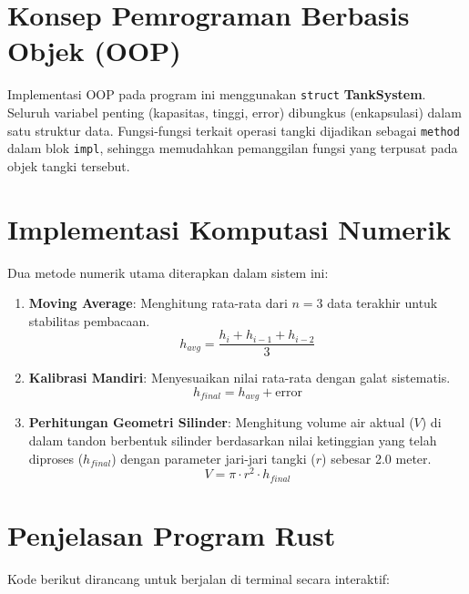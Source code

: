 \documentclass[12pt,a4paper]{article}
\begin{document}
\section{Konsep Pemrograman Berbasis Objek (OOP)}
Implementasi OOP pada program ini menggunakan \texttt{struct} \textbf{TankSystem}. Seluruh variabel penting (kapasitas, tinggi, error) dibungkus (enkapsulasi) dalam satu struktur data. Fungsi-fungsi terkait operasi tangki dijadikan sebagai \texttt{method} dalam blok \texttt{impl}, sehingga memudahkan pemanggilan fungsi yang terpusat pada objek tangki tersebut.

\section{Implementasi Komputasi Numerik}
Dua metode numerik utama diterapkan dalam sistem ini:
\begin{enumerate}
    \item \textbf{Moving Average}: Menghitung rata-rata dari $n=3$ data terakhir untuk stabilitas pembacaan.
    \begin{equation}
        h_{avg} = \frac{h_i + h_{i-1} + h_{i-2}}{3}
    \end{equation}
    \item \textbf{Kalibrasi Mandiri}: Menyesuaikan nilai rata-rata dengan galat sistematis.
    \begin{equation}
        h_{final} = h_{avg} + \text{error}
    \end{equation}
    \item \textbf{Perhitungan Geometri Silinder}: Menghitung volume air aktual ($V$) di dalam tandon berbentuk silinder berdasarkan nilai ketinggian yang telah diproses ($h_{final}$) dengan parameter jari-jari tangki ($r$) sebesar 2.0 meter.
    \begin{equation}
        V = \pi \cdot r^2 \cdot h_{final}
    \end{equation}
\end{enumerate}

\section{Penjelasan Program Rust}
Kode berikut dirancang untuk berjalan di terminal secara interaktif:
\end{document}
